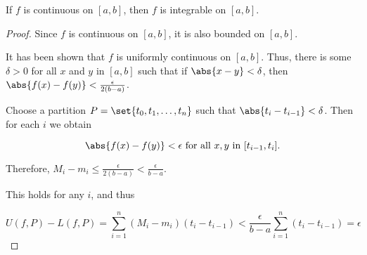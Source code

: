 \documentclass[11pt]{scrartcl}
\begin{document}
\begin{theorem}
  If \(f\) is continuous on \([a, b]\), then \(f\) is integrable on
  \([a, b]\).
\end{theorem}
\begin{proof}

Since \(f\) is continuous on \([a, b]\), it is also bounded on
\([a,b]\).

It has been shown that \(f\) is uniformly continuous on \([a,
b]\). Thus, there is some \(\delta > 0\) for all \(x\) and \(y\) in
\([a,b]\) such that if \(\abs{x-y}<\delta\), then
\(\abs{f(x) - f(y)} < \frac{\epsilon}{2(b-a)}\).

Choose a partition \(P=\set{t_{0}, t_{1}, \dots, t_{n}}\) such that
\(\abs{t_{i} - t_{i-1}} < \delta\). Then for each \(i\) we obtain

\begin{equation*}
  \abs{f(x) - f(y)} < \epsilon\text{ for all \(x, y\) in \([t_{i-1}, t_{i}]\)}.
\end{equation*}

Therefore,
\(M_{i} - m_{i} \leq \frac{\epsilon}{2(b-a)} < \frac{\epsilon}{b-a}\).

This holds for any \(i\), and thus


\begin{equation*}
  U(f, P) - L(f, P) = \sum_{i=1}^{n} (M_{i} - m_{i})(t_{i} - t_{i-1}) < \frac{\epsilon}{b-a}\sum_{i=1}^{n}(t_{i} - t_{i-1}) = \epsilon
\end{equation*}
\end{proof}
\end{document}
